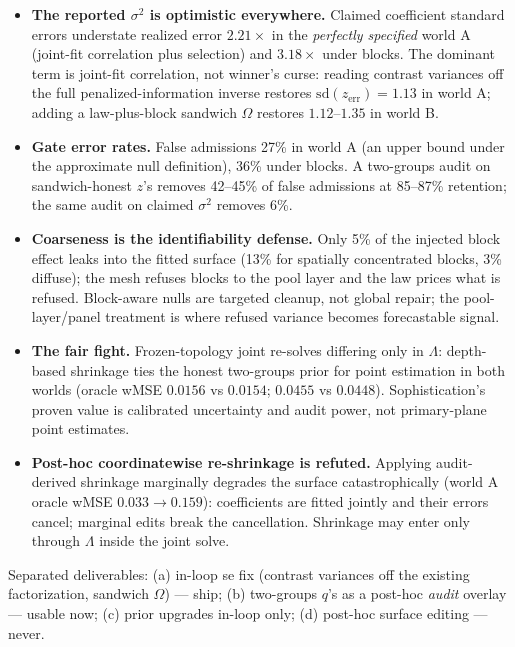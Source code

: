 \begin{itemize}[leftmargin=2em,itemsep=2pt]
\item \textbf{The reported $\sigma^2$ is optimistic everywhere.} Claimed
coefficient standard errors understate realized error $2.21\times$ in the
\emph{perfectly specified} world A (joint-fit correlation plus selection) and
$3.18\times$ under blocks. The dominant term is joint-fit correlation, not
winner's curse: reading contrast variances off the full penalized-information
inverse restores $\mathrm{sd}(z_{\mathrm{err}})=1.13$ in world A; adding a
law-plus-block sandwich $\Omega$ restores $1.12$--$1.35$ in world B.
\item \textbf{Gate error rates.} False admissions 27\% in world A (an upper
bound under the approximate null definition), 36\% under blocks. A two-groups
audit on sandwich-honest $z$'s removes 42--45\% of false admissions at
85--87\% retention; the same audit on claimed $\sigma^2$ removes 6\%.
\item \textbf{Coarseness is the identifiability defense.} Only 5\% of the
injected block effect leaks into the fitted surface (13\% for spatially
concentrated blocks, 3\% diffuse); the mesh refuses blocks to the pool layer
and the law prices what is refused. Block-aware nulls are targeted cleanup,
not global repair; the pool-layer/panel treatment is where refused variance
becomes forecastable signal.
\item \textbf{The fair fight.} Frozen-topology joint re-solves differing only
in $\Lambda$: depth-based shrinkage ties the honest two-groups prior for point
estimation in both worlds (oracle wMSE $0.0156$ vs $0.0154$;
$0.0455$ vs $0.0448$). Sophistication's proven value is calibrated
uncertainty and audit power, not primary-plane point estimates.
\item \textbf{Post-hoc coordinatewise re-shrinkage is refuted.} Applying
audit-derived shrinkage marginally degrades the surface catastrophically
(world A oracle wMSE $0.033\to0.159$): coefficients are fitted jointly and
their errors cancel; marginal edits break the cancellation. Shrinkage may
enter only through $\Lambda$ inside the joint solve.
\end{itemize}

Separated deliverables: (a) in-loop se fix (contrast variances off the
existing factorization, sandwich $\Omega$) --- ship; (b) two-groups $q$'s as a
post-hoc \emph{audit} overlay --- usable now; (c) prior upgrades in-loop only;
(d) post-hoc surface editing --- never.


